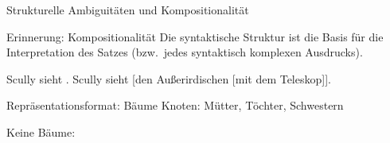 \begin{frame}
  {Strukturelle Ambiguitäten und Kompositionalität}
  \pause
  \begin{exe}
  \end{exe}
  \pause
  \Halbzeile
  \begin{block}{Erinnerung: Kompositionalität}
    Die syntaktische Struktur ist die Basis für die Interpretation des Satzes (bzw.\ jedes syntaktisch komplexen Ausdrucks).
  \end{block}
  \pause
  \Halbzeile
  \begin{exe}
    \ex
    \begin{xlist}
      \ex Scully sieht  .
      \pause
      \pause
      \pause
      \ex Scully sieht \alert<8->{[den Außerirdischen [mit dem Teleskop]]}.
    \end{xlist}
  \end{exe}
\end{frame}


\begin{frame}
  {Repräsentationsformat: Bäume}
  \pause
  Knoten: Mütter, Töchter, Schwestern\\
  \pause
  \Halbzeile
  \Halbzeile
  \pause
  Keine Bäume:~
\end{frame}


